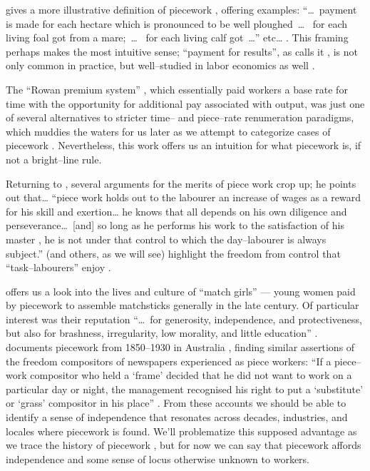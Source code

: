 \documentclass[trackingWork]{subfiles}
\begin{document}
\citeauthor{10.2307/2338394} gives a more illustrative definition of piecework%
, offering examples:
``\dots~payment is made for each hectare which is pronounced to be well ploughed~\dots~
for each living foal got from a mare;~\dots~
for each living calf got~\dots'' etc\dots
\cite{10.2307/2338394}.
This framing perhaps makes the most intuitive sense;
``payment for results'', as \citeauthor{10.2307/2338394} calls it%
, is not only common in practice, but well--studied in labor economics as well
\cite{Figlio2007901,weitzman1976new,10.2307/3003414,BJIR:BJIR038}.

The ``Rowan premium system''%
, which essentially paid workers a base rate for time with the opportunity for additional pay associated with output,
was just one of several alternatives to stricter time-- and piece--rate renumeration paradigms, which
muddies the waters for us later as we attempt to categorize cases of piecework
\cite{rowan1901premium}.
Nevertheless,
this work offers us an intuition for what piecework is, if not a bright--line rule.

Returning to
\citeauthor{hughRaynbirdTaskWork}, several arguments for the merits of piece work%
crop up; he points out that\dots
``piece work holds out to the labourer an increase of wages as a reward for his skill and exertion\dots
he knows that all depends on his own diligence and perseverance\dots~[and]
so long as he performs his work to the satisfaction of his master%
, he is not under that control to which the day--labourer is always subject.''
\citeauthor{hughRaynbirdTaskWork} (and others, as we will see)
highlight the freedom from control that ``task--labourers'' enjoy
\cite{hughRaynbirdTaskWork,rowan1901premium}.

\citeauthor{10.2307/3827491} offers us a look into the lives and culture of ``match girls''
--- young women paid by piecework to assemble matchsticks generally in the late  century.
Of particular interest was their reputation ``\dots~for generosity, independence, and protectiveness,
but also for brashness, irregularity, low morality, and little education''
\cite{10.2307/3827491}.
\citeauthor{10.2307/27508091} documents piecework from 1850--1930 in Australia%
, finding similar assertions of the freedom compositors of newspapers experienced as piece workers:
``If a piece--work compositor who held a `frame' decided that he did not want to work on a particular day or night,
the management recognised his right to put a `substitute' or `grass' compositor in his place''
\cite{10.2307/27508091}.
From these accounts we should be able to identify
a sense of independence that
resonates across decades, industries, and locales where piecework is found.
We'll problematize this supposed advantage as we trace the history of piecework%
, but for now we can say that piecework affords
independence and some sense of locus
otherwise unknown to workers.
\end{document}
